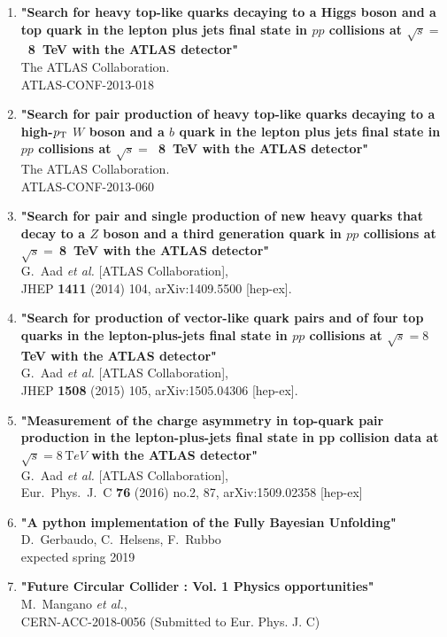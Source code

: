 \documentclass[12pt]{article}
\begin{document}
\begin{enumerate}
\item
{\bf "Search for heavy top-like quarks decaying to a Higgs boson and a top quark in the lepton plus jets final state in $pp$ collisions at $\sqrt{s}=$~8~TeV with the ATLAS detector"}
  \\{}The ATLAS Collaboration.
  \\{}ATLAS-CONF-2013-018
  
\item
{\bf "Search for pair production of heavy top-like quarks decaying to a high-$p_{\rm T}$ $W$ boson and a $b$ quark in the lepton plus jets final state in $pp$ collisions at $\sqrt{s}=$~8~TeV with the ATLAS detector"}
  \\{}The ATLAS Collaboration.
 \\{}ATLAS-CONF-2013-060

\item
{\bf "Search for pair and single production of new heavy quarks that decay to a $Z$ boson and a third generation quark in $pp$ collisions at $\sqrt{s}=~$8~TeV with the ATLAS detector"}
\\{}G.~Aad {\it et al.} [ATLAS Collaboration],
\\{}JHEP {\bf 1411} (2014) 104, arXiv:1409.5500 [hep-ex].
   

\item
 {\bf "Search for production of vector-like quark pairs and of four top quarks in the lepton-plus-jets final state in $pp$ collisions at $\sqrt{s}=8$ TeV with the ATLAS detector"}
\\{}  G.~Aad {\it et al.} [ATLAS Collaboration],
\\{} JHEP {\bf 1508} (2015) 105, arXiv:1505.04306 [hep-ex].
  

\item
{\bf "Measurement of the charge asymmetry in top-quark pair production in the lepton-plus-jets final state in pp collision data at $\sqrt{s}=8\,\mathrm TeV{}$ with the ATLAS detector"}
\\{}G.~Aad {\it et al.} [ATLAS Collaboration],
\\{}Eur.\ Phys.\ J.\ C {\bf 76} (2016) no.2, 87, arXiv:1509.02358 [hep-ex]
 
\item
{\bf "A python implementation of the Fully Bayesian Unfolding"}
\\{}  D.~Gerbaudo, C.~Helsens, F.~Rubbo
\\{}  expected spring 2019
 
 
\item
{\bf "Future Circular Collider : Vol. 1 Physics opportunities"}
\\{}  M.~Mangano {\it et al.},
\\{}  CERN-ACC-2018-0056 (Submitted to Eur. Phys. J. C)


\end{enumerate}
\end{document}
